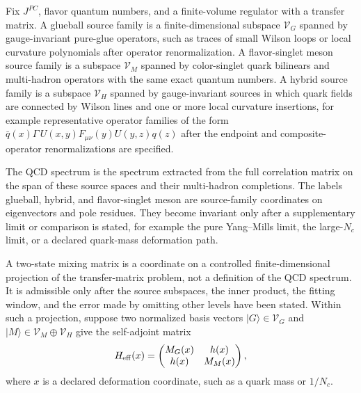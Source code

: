 \begin{definition}
\label{def:qcd-glueball-hybrid-source-families}
Fix \(J^{PC}\), flavor quantum numbers, and a finite-volume regulator with a
transfer matrix.  A glueball source family is a finite-dimensional subspace
\(\mathcal V_G\) spanned by gauge-invariant pure-glue operators, such as
traces of small Wilson loops or local curvature polynomials after operator
renormalization.  A flavor-singlet meson source family is a subspace
\(\mathcal V_M\) spanned by color-singlet quark bilinears and multi-hadron
operators with the same exact quantum numbers.  A hybrid source family is a
subspace \(\mathcal V_H\) spanned by gauge-invariant sources in which quark
fields are connected by Wilson lines and one or more local curvature
insertions, for example representative operator families of the form
\(\bar q(x)\Gamma\,U(x,y)F_{\mu\nu}(y)U(y,z)q(z)\) after the endpoint and
composite-operator renormalizations are specified.

The QCD spectrum is the spectrum extracted from the full correlation matrix
on the span of these source spaces and their multi-hadron completions.  The
labels glueball, hybrid, and flavor-singlet meson are source-family
coordinates on eigenvectors and pole residues.  They become invariant only
after a supplementary limit or comparison is stated, for example the pure
Yang--Mills limit, the large-\(N_c\) limit, or a declared quark-mass
deformation path.
\end{definition}

\begin{definition}
\label{ca:qcd-two-state-glueball-hybrid-mixing}
A two-state mixing matrix is a coordinate on a controlled finite-dimensional
projection of the transfer-matrix problem, not a definition of the QCD
spectrum.  It is admissible only after the source subspaces, the inner
product, the fitting window, and the error made by omitting other levels have
been stated.  Within such a projection, suppose two normalized basis vectors
\(|G\rangle\in\mathcal V_G\) and
\(|M\rangle\in\mathcal V_M\oplus\mathcal V_H\) give the self-adjoint matrix
\begin{equation}
  H_{\rm eff}(x)=
  \begin{pmatrix}
    M_G(x)&h(x)\\
    h(x)&M_M(x)
  \end{pmatrix},
  \label{eq:qcd-two-state-mixing-hamiltonian}
\end{equation}
where \(x\) is a declared deformation coordinate, such as a quark mass or
\(1/N_c\).
\end{definition}

